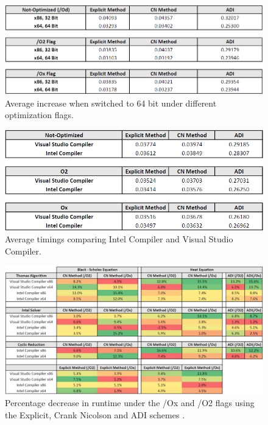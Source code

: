 \documentclass[12pt, oneside]{book}
\theoremstyle{plain}
\theoremstyle{definition}
\begin{document}
\begin{figure}[!htb]
    \centering
        \includegraphics[scale=0.65]{bit.png}
    \caption{Average increase when switched to 64 bit under different optimization flags.}
\end{figure}

\begin{figure}[!htb]
    \centering
        \includegraphics[scale=0.65]{compilerT.png}
    \caption{Average timings comparing Intel Compiler and Visual Studio Compiler.}
\end{figure}

\begin{figure}[!htb]
    \centering
        \includegraphics[scale=0.5]{FlagPercent.png}
    \caption{Percentage decrease in runtime under the /Ox and /O2 flags using the Explicit, Crank Nicolson and ADI schemes .}
    \label{flagPercent}
\end{figure}




\end{document}
